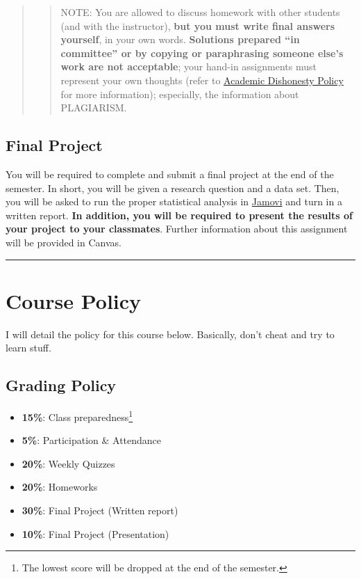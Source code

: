 \documentclass[11pt,]{article}
\begin{document}
\begin{quote}
\begin{quote}
NOTE: You are allowed to discuss homework with other students (and with
the instructor), \textbf{but you must write final answers yourself}, in
your own words. \textbf{Solutions prepared ``in committee'' or by
copying or paraphrasing someone else's work are not acceptable}; your
hand-in assignments must represent your own thoughts (refer to
\protect\hyperlink{dishonesty}{Academic Dishonesty Policy} for more
information); especially, the information about PLAGIARISM.
\end{quote}
\end{quote}

\hypertarget{final-project}{%
\subsection{Final Project}\label{final-project}}

You will be required to complete and submit a final project at the end
of the semester. In short, you will be given a research question and a
data set. Then, you will be asked to run the proper statistical analysis
in \protect\hyperlink{supplies}{Jamovi} and turn in a written report.
\textbf{In addition, you will be required to present the results of your
project to your classmates}. Further information about this assignment
will be provided in Canvas.

\begin{center}\rule{0.5\linewidth}{0.5pt}\end{center}

\hypertarget{course-policy}{%
\section{Course Policy}\label{course-policy}}

I will detail the policy for this course below. Basically, don't cheat
and try to learn stuff.

\hypertarget{grading-policy}{%
\subsection{Grading Policy}\label{grading-policy}}

\begin{itemize}
\item
  \textbf{15\%}: Class preparedness\footnote{The lowest score will be
    dropped at the end of the semester.}
\item
  \textbf{5\%}: Participation \& Attendance
\item
  \textbf{20\%}: Weekly Quizzes
\item
  \textbf{20\%}: Homeworks
\item
  \textbf{30\%}: Final Project (Written report)
\item
  \textbf{10\%}: Final Project (Presentation)
\end{itemize}
\end{document}
